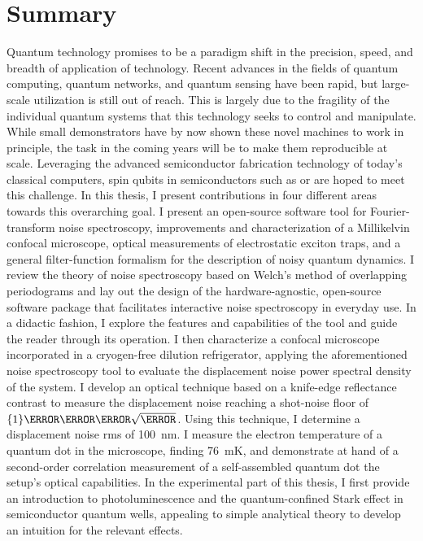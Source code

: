 \chapter*{Summary}
Quantum technology promises to be a paradigm shift in the precision, speed, and breadth of application of technology.
Recent advances in the fields of quantum computing, quantum networks, and quantum sensing have been rapid, but large-scale utilization is still out of reach.
This is largely due to the fragility of the individual quantum systems that this technology seeks to control and manipulate.
While small demonstrators have by now shown these novel machines to work in principle, the task in the coming years will be to make them reproducible at scale.
Leveraging the advanced semiconductor fabrication technology of today's classical computers, spin qubits in semiconductors such as  or  are hoped to meet this challenge.
In this thesis, I present contributions in four different areas towards this overarching goal.
I present an open-source software tool for Fourier-transform noise spectroscopy, improvements and characterization of a Millikelvin confocal microscope, optical measurements of electrostatic exciton traps, and a general filter-function formalism for the description of noisy quantum dynamics.
I review the theory of noise spectroscopy based on Welch's method of overlapping periodograms and lay out the design of the hardware-agnostic, open-source \pyspeck software package that facilitates interactive noise spectroscopy in everyday use.
In a didactic fashion, I explore the features and capabilities of the tool and guide the reader through its operation.
I then characterize a confocal microscope incorporated in a cryogen-free dilution refrigerator, applying the aforementioned noise spectroscopy tool to evaluate the displacement noise power spectral density of the system.
I develop an optical technique based on a knife-edge reflectance contrast to measure the displacement noise reaching a shot-noise floor of $\qty{1}{\nano\meter\per\sqrt{\hertz}}$.
Using this technique, I determine a displacement noise \acrshort{rms} of \qty{100}{\nano\meter}.
I measure the electron temperature of a  quantum dot in the microscope, finding \qty{76}{\milli\kelvin}, and demonstrate at hand of a second-order correlation measurement of a self-assembled quantum dot the setup's optical capabilities.
In the experimental part of this thesis, I first provide an introduction to photoluminescence and the quantum-confined Stark effect in semiconductor quantum wells, appealing to simple analytical theory to develop an intuition for the relevant effects.
